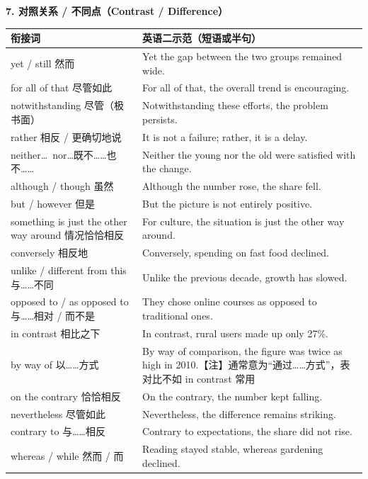 \documentclass[11pt,a4paper]{ctexart}
\begin{document}
\par\addvspace{6pt}\noindent\textbf{7. 对照关系 / 不同点（Contrast / Difference）}\par\addvspace{2pt}
\begin{longtable}{L{5.4cm}L{10.6cm}}
\toprule
\textbf{衔接词} & \textbf{英语二示范（短语或半句）} \\
\midrule
\endhead
yet / still 然而 & Yet the gap between the two groups remained wide. \\
for all of that 尽管如此 & For all of that, the overall trend is encouraging. \\
notwithstanding 尽管（极书面） & Notwithstanding these efforts, the problem persists. \\
rather 相反 / 更确切地说 & It is not a failure; rather, it is a delay. \\
neither\ldots\ nor\ldots 既不……也不…… & Neither the young nor the old were satisfied with the change. \\
although / though 虽然 & Although the number rose, the share fell. \\
but / however 但是 & But the picture is not entirely positive. \\
something is just the other way around 情况恰恰相反 & For culture, the situation is just the other way around. \\
conversely 相反地 & Conversely, spending on fast food declined. \\
unlike / different from this 与……不同 & Unlike the previous decade, growth has slowed. \\
opposed to / as opposed to 与……相对 / 而不是 & They chose online courses as opposed to traditional ones. \\
in contrast 相比之下 & In contrast, rural users made up only 27\%. \\
by way of 以……方式 & By way of comparison, the figure was twice as high in 2010.【注】通常意为“通过……方式”，表对比不如 in contrast 常用 \\
on the contrary 恰恰相反 & On the contrary, the number kept falling. \\
nevertheless 尽管如此 & Nevertheless, the difference remains striking. \\
contrary to 与……相反 & Contrary to expectations, the share did not rise. \\
whereas / while 然而 / 而 & Reading stayed stable, whereas gardening declined. \\
\bottomrule
\end{longtable}
\end{document}
